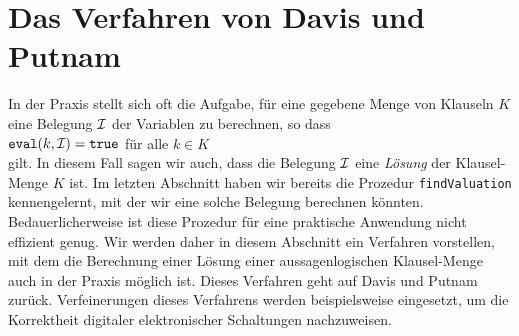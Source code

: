 \section{Das Verfahren von Davis und Putnam}
In der Praxis stellt sich oft die Aufgabe, f\"{u}r eine gegebene Menge von Klauseln $K$ eine
Belegung $\mathcal{I}$ der Variablen zu berechnen, so dass 
\\[0.2cm]
\hspace*{1.3cm} $\texttt{eval}(k,\mathcal{I}) = \texttt{true}$ \quad f\"{u}r alle $k\in K$ \\[0.2cm]
gilt.  In diesem Fall sagen wir auch, dass die Belegung $\mathcal{I}$ eine \emph{\color{blue}L\"{o}sung} der
 Klausel-Menge $K$ ist.  Im letzten Abschnitt haben wir bereits die Prozedur \texttt{findValuation}
 kennengelernt, mit der wir eine solche Belegung berechnen k\"{o}nnten.
Bedauerlicherweise ist diese Prozedur f\"{u}r eine praktische Anwendung nicht effizient genug.
Wir werden daher in diesem Abschnitt ein Verfahren vorstellen, mit dem die Berechnung einer L\"{o}sung
einer aussagenlogischen Klausel-Menge auch in der Praxis m\"{o}glich ist.
Dieses Verfahren geht auf Davis und Putnam
\cite{davis62} zur\"{u}ck.  Verfeinerungen dieses Verfahrens werden beispielsweise
eingesetzt, um die Korrektheit digitaler elektronischer Schaltungen nachzuweisen.  


